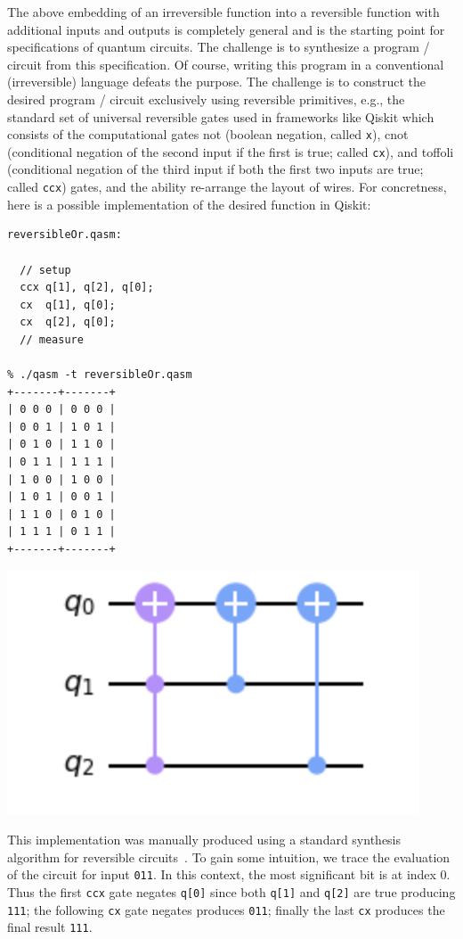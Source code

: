 The above embedding of an irreversible function into a reversible function with additional inputs and outputs is completely general and is the starting point for specifications of quantum circuits. The challenge is to synthesize a program / circuit from this specification. Of course, writing this program in a conventional (irreversible) language defeats the purpose. The challenge is to construct the desired program / circuit exclusively using reversible primitives, e.g., the standard set of universal reversible gates used in frameworks like Qiskit which consists of the computational gates \textsf{not} (boolean negation, called \verb|x|), \textsf{cnot} (conditional negation of the second input if the first is true; called \verb|cx|), and \textsf{toffoli} (conditional negation of the third input if both the first two inputs are true; called \verb|ccx|) gates, and the ability re-arrange the layout of wires. For concretness, here is a possible implementation of the desired function in Qiskit:

\begin{center}
  \begin{minipage}[c]{0.4\linewidth}
\begin{verbatim}
reversibleOr.qasm:

  // setup
  ccx q[1], q[2], q[0];
  cx  q[1], q[0];
  cx  q[2], q[0];
  // measure

% ./qasm -t reversibleOr.qasm
+-------+-------+
| 0 0 0 | 0 0 0 |
| 0 0 1 | 1 0 1 |
| 0 1 0 | 1 1 0 |
| 0 1 1 | 1 1 1 |
| 1 0 0 | 1 0 0 |
| 1 0 1 | 0 0 1 |
| 1 1 0 | 0 1 0 |
| 1 1 1 | 0 1 1 |
+-------+-------+
  \end{verbatim}
  \end{minipage}
  \qquad
  \includegraphics[scale=0.7]{reversibleOr.png}
\end{center}

This implementation was manually produced using a standard synthesis algorithm for reversible circuits~\cite{10.1145/775832.775915}. To gain some intuition, we trace the evaluation of the circuit for input \verb|011|. In this context, the most significant bit is at index 0. Thus the first \verb|ccx| gate negates \verb|q[0]| since both \verb|q[1]| and \verb|q[2]| are true producing \verb|111|; the following \verb|cx| gate negates produces \verb|011|; finally the last \verb|cx| produces the final result \verb|111|.

